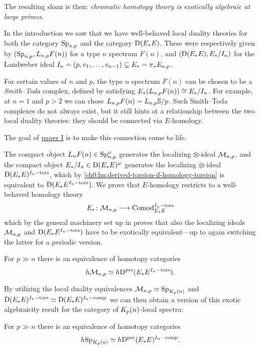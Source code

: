 The resulting sloan is then: \emph{chromatic homotopy theory is exotically algebraic at large primes.} 

In the introduction we saw that we have well-behaved local duality theories for both the category $\mathrm{Sp}_{n,p}$ and the category $\mathrm{D}(E_*E)$. These were respectively given by $(\mathrm{Sp}_{n,p}, L_{n,p} F(n))$ for a type $n$ spectrum $F(n)$, and $(\mathrm{D}(E_*E), E_*/I_n)$ for the Landweber ideal $I_n=(p, v_1, \ldots, v_{n-1})\subseteq E_*= \pi_* E_{n,p}$.

For certain values of $n$ and $p$, the type $n$ spectrum $F(n)$ can be chosen to be a \emph{Smith--Toda} complex, defined by satisfying $E_*(L_{n,p} F(n)) \cong E_*/I_n$. For example, at $n=1$ and $p>2$ we can chose $L_{n,p} F(n) = L_{n,p}\mathbb{S}/p$. Such Smith--Toda complexes do not always exist, but it still hints at a relationship between the two local duality theories: they should be connected via $E$-homology. 

The goal of \hyperref[ch1]{paper I} is to make this connection come to life. 

The compact object $L_n F(n)\in \mathrm{Sp}_{n,p}^\omega$ generates the localizing $\otimes$-ideal $\mathcal{M}_{n,p}$, and the compact object $E_*/I_n \in \mathrm{D}(E_*E)^\omega$ generates the localizing $\otimes$-ideal $\mathrm{D}(E_*E)^{I_n-\mathrm{tors}}$, which by \cref{ch0:lm:derived-torsion-if-homology-torsion} is equivalent to $\mathrm{D}(E_*E^{I_n-\mathrm{tors}})$. We prove that $E$-homology restricts to a well-behaved homology theory 
\[E_*\colon \mathcal{M}_{n,p}\longrightarrow \mathrm{Comod}_{E_*E}^{I_n-\mathrm{tors}}\] 
which by the general machinery set up in \cite{patchkoria-pstragowski_2021} proves that also the localizing ideals $\mathcal{M}_{n,p}$ and $\mathrm{D}(E_*E^{I_n-\mathrm{tors}})$ have to be exotically equivalent---up to again switching the latter for a periodic version. 

\begin{theorem}
    \label{ch0:summary1:thm:B}
    For $p\gg n$ there is an equivalence of homotopy categories
    \[h \mathcal{M}_{n,p} \simeq h \mathrm{D}^{\mathrm{per}}(E_*E^{I_n-\mathrm{tors}}).\]
\end{theorem}

By utilizing the local duality equivalences $\mathcal{M}_{n,p} \simeq \mathrm{Sp}_{K_p(n)}$ and $\mathrm{D}(E_*E)^{I_n-\mathrm{tors}} \simeq \mathrm{D}(E_*E)^{I_n-\mathrm{comp}}$ we can then obtain a version of this exotic algebraicity result for the category of ${K_p(n)}$-local spectra: 

\begin{theorem}
    \label{ch0:summary1:thm:A}
    For $p \gg n$ there is an equivalence of homotopy categories
    \[h \mathrm{Sp}_{K_p(n)} \simeq h \mathrm{D}^{\mathrm{per}}(E_*E)^{I_n-\mathrm{comp}}.\]
\end{theorem}

